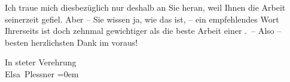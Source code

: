 \pstart
           Ich traue mich diesbezüglich nur deshalb an Sie heran, weil Ihnen die Arbeit seinerzeit gefiel. Aber – Sie wissen
               ja, wie das ist, – ein empfehlendes Wort Ihrerseits ist doch zehnmal gewichtiger als
               die beste Arbeit einer \label{K_L03694-3v}\label{K_L03694-3}. – Also – besten herzlichsten Dank im voraus!\pend
           
\pstart
           In steter Verehrung{\\[\baselineskip]}\spacefill\mbox{Elsa Plessner}\pend
           \leftskip=0em{}\endnumbering{}
\begin{anhang}
\end{anhang}
      